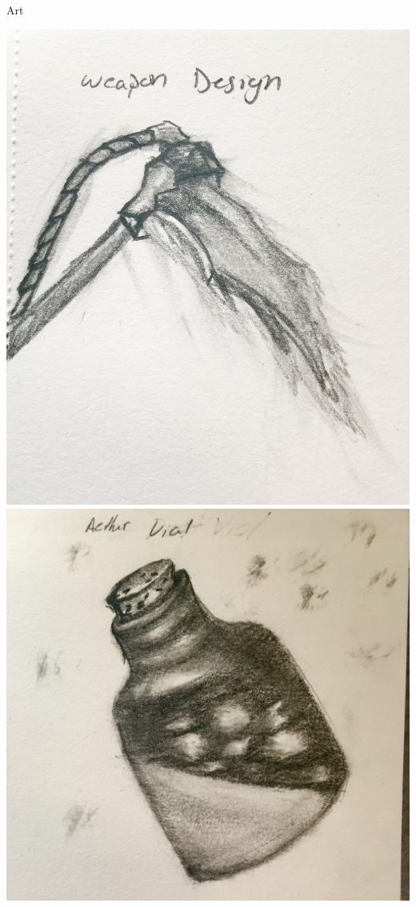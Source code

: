 \documentclass{teamepsilon}
\begin{document}
\begin{frame}{Art}
\begin{minipage}{0.35\textwidth-1em}
        \includegraphics[width=\textwidth]{../graphics/scythe}
        \vspace{4mm}
        \includegraphics[width=\textwidth]{../graphics/bottle}
    \end{minipage}

\end{frame}
\end{document}
